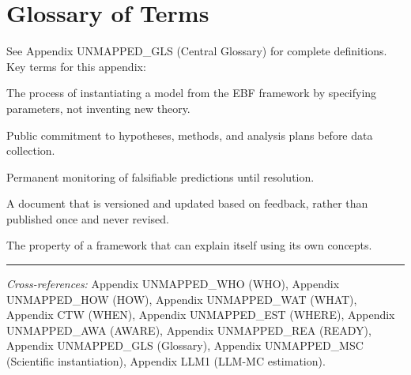 
\section{Glossary of Terms}
\label{sec:apply-glossary}

See Appendix UNMAPPED_GLS (Central Glossary) for complete definitions. Key terms for
this appendix:

\begin{description}[nosep]
    \item[Derivation] The process of instantiating a model from the EBF framework
        by specifying parameters, not inventing new theory.
    \item[Pre-registration] Public commitment to hypotheses, methods, and analysis
        plans before data collection.
    \item[Prediction tracking] Permanent monitoring of falsifiable predictions
        until resolution.
    \item[Living document] A document that is versioned and updated based on
        feedback, rather than published once and never revised.
    \item[Reflexive validity] The property of a framework that can explain itself
        using its own concepts.
\end{description}



\vspace{1em}
\hrule
\vspace{0.5em}

\noindent\textit{Cross-references:}
Appendix UNMAPPED_WHO (WHO),
Appendix UNMAPPED_HOW (HOW),
Appendix UNMAPPED_WAT (WHAT),
Appendix CTW (WHEN),
Appendix UNMAPPED_EST (WHERE),
Appendix UNMAPPED_AWA (AWARE),
Appendix UNMAPPED_REA (READY),
Appendix UNMAPPED_GLS (Glossary),
Appendix UNMAPPED_MSC (Scientific instantiation),
Appendix LLM1 (LLM-MC estimation).



